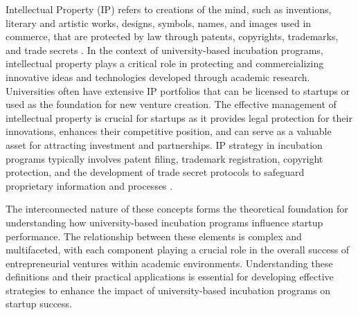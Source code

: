 \documentclass[../Main.tex]{subfiles}
\begin{document}
Intellectual Property (IP) refers to creations of the mind, such as inventions, literary and artistic works, designs, symbols, names, and images used in commerce, that are protected by law through patents, copyrights, trademarks, and trade secrets \autocite{wipo2020intellectual}. In the context of university-based incubation programs, intellectual property plays a critical role in protecting and commercializing innovative ideas and technologies developed through academic research. Universities often have extensive IP portfolios that can be licensed to startups or used as the foundation for new venture creation. The effective management of intellectual property is crucial for startups as it provides legal protection for their innovations, enhances their competitive position, and can serve as a valuable asset for attracting investment and partnerships. IP strategy in incubation programs typically involves patent filing, trademark registration, copyright protection, and the development of trade secret protocols to safeguard proprietary information and processes \autocite{grimaldi2005university, phan2005university}.

The interconnected nature of these concepts forms the theoretical foundation for understanding how university-based incubation programs influence startup performance. The relationship between these elements is complex and multifaceted, with each component playing a crucial role in the overall success of entrepreneurial ventures within academic environments. Understanding these definitions and their practical applications is essential for developing effective strategies to enhance the impact of university-based incubation programs on startup success.
\end{document}
